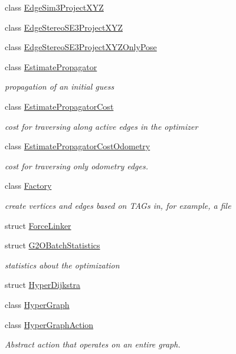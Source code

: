 \begin{DoxyCompactItemize}
class \hyperlink{classg2o_1_1EdgeSim3ProjectXYZ}{Edge\+Sim3\+Project\+X\+YZ}
\item 
class \hyperlink{classg2o_1_1EdgeStereoSE3ProjectXYZ}{Edge\+Stereo\+S\+E3\+Project\+X\+YZ}
\item 
class \hyperlink{classg2o_1_1EdgeStereoSE3ProjectXYZOnlyPose}{Edge\+Stereo\+S\+E3\+Project\+X\+Y\+Z\+Only\+Pose}
\item 
class \hyperlink{classg2o_1_1EstimatePropagator}{Estimate\+Propagator}
\begin{DoxyCompactList}\small\item\em propagation of an initial guess \end{DoxyCompactList}\item 
class \hyperlink{classg2o_1_1EstimatePropagatorCost}{Estimate\+Propagator\+Cost}
\begin{DoxyCompactList}\small\item\em cost for traversing along active edges in the optimizer \end{DoxyCompactList}\item 
class \hyperlink{classg2o_1_1EstimatePropagatorCostOdometry}{Estimate\+Propagator\+Cost\+Odometry}
\begin{DoxyCompactList}\small\item\em cost for traversing only odometry edges. \end{DoxyCompactList}\item 
class \hyperlink{classg2o_1_1Factory}{Factory}
\begin{DoxyCompactList}\small\item\em create vertices and edges based on T\+A\+Gs in, for example, a file \end{DoxyCompactList}\item 
struct \hyperlink{structg2o_1_1ForceLinker}{Force\+Linker}
\item 
struct \hyperlink{structg2o_1_1G2OBatchStatistics}{G2\+O\+Batch\+Statistics}
\begin{DoxyCompactList}\small\item\em statistics about the optimization \end{DoxyCompactList}\item 
struct \hyperlink{structg2o_1_1HyperDijkstra}{Hyper\+Dijkstra}
\item 
class \hyperlink{classg2o_1_1HyperGraph}{Hyper\+Graph}
\item 
class \hyperlink{classg2o_1_1HyperGraphAction}{Hyper\+Graph\+Action}
\begin{DoxyCompactList}\small\item\em Abstract action that operates on an entire graph. \end{DoxyCompactList}\item 

\end{DoxyCompactItemize}
